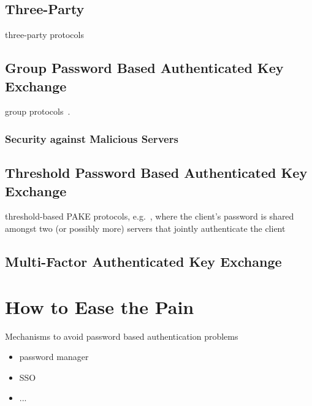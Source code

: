 
\subsection{Three-Party }
three-party protocols~\cite{Abdalla2005,Abdalla2007}

\subsection{Group Password Based Authenticated Key Exchange}
group protocols~\cite{AbdallaP06,AbdallaBVS07}. 

\subsubsection{Security against Malicious Servers}

\subsection{Threshold Password Based Authenticated Key Exchange}
threshold-based PAKE protocols, e.g.~\cite{Abdalla2005b,Bagherzandi2011}, where the client's password is shared amongst two (or possibly more) servers that jointly authenticate the client

\subsection{Multi-Factor Authenticated Key Exchange}


\section{How to Ease the Pain}
Mechanisms to avoid password based authentication problems
\begin{itemize}
	\item password manager
	\item SSO
	\item ...
\end{itemize}


